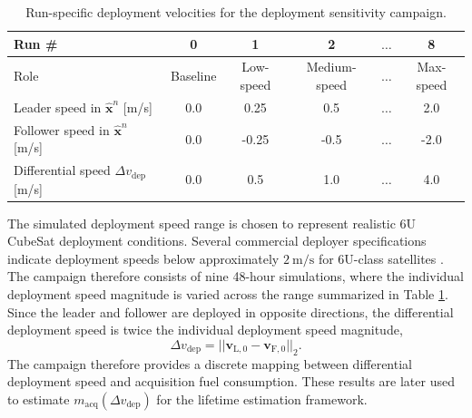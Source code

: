\begin{table}[H]
    \centering
    \caption{Run-specific deployment velocities for the deployment sensitivity campaign.}
    \label{tab:deployment_velocity_sensitivity_runs}
    \begin{tabular}{lccccc}
        \toprule
        \textbf{Run \#} & \textbf{0} & \textbf{1} & \textbf{2} & \textbf{$\dots$} & \textbf{8} \\
        \midrule
        Role & Baseline & Low-speed & Medium-speed & $\dots$ & Max-speed \\
        Leader speed in $\hat{\mathbf{x}}^n$ [m/s] & 0.0 & 0.25 & 0.5 & $\dots$ & 2.0 \\
        Follower speed in $\hat{\mathbf{x}}^n$ [m/s] & 0.0 & -0.25 & -0.5 & $\dots$ & -2.0 \\
        Differential speed $\Delta v_{\mathrm{dep}}$ [m/s] & 0.0 & 0.5 & 1.0 & $\dots$ & 4.0 \\
        \bottomrule
    \end{tabular}
\end{table}
The simulated deployment speed range is chosen to represent realistic 6U CubeSat deployment conditions. Several commercial deployer specifications indicate deployment speeds below approximately $2~\mathrm{m/s}$ for 6U-class satellites \cite{satsearch2026dhruva_dsod6u, isispace2026quadpack, nanoracks2018nrcsde_idd}. The campaign therefore consists of nine 48-hour simulations, where the individual deployment speed magnitude is varied across the range summarized in Table \ref{tab:deployment_velocity_sensitivity_runs}. Since the leader and follower are deployed in opposite directions, the differential deployment speed is twice the individual deployment speed magnitude,
\begin{equation}
\Delta v_{\mathrm{dep}}
=
||
\mathbf{v}_{\mathrm{L},0}
-
\mathbf{v}_{\mathrm{F},0}
||_2 .
\end{equation}
The campaign therefore provides a discrete mapping between differential deployment speed and acquisition fuel consumption. These results are later used to estimate $m_{\mathrm{acq}}(\Delta v_{\mathrm{dep}})$ for the lifetime estimation framework.

